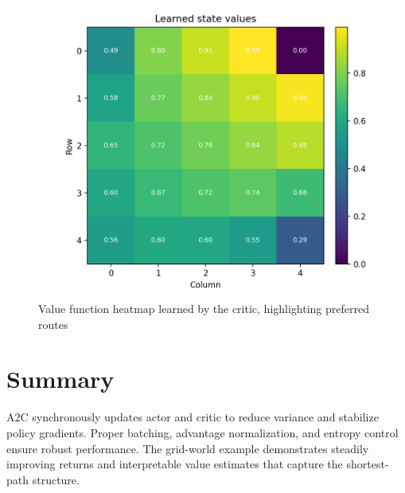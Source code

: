 ﻿\documentclass[12pt]{article}
\begin{document}
\begin{figure}[H]
  \centering
  \includegraphics[width=0.82\linewidth]{a2c_value_baseline.png}
  \caption{Value function heatmap learned by the critic, highlighting preferred routes}
  \label{fig:a2c_value_baseline}
\end{figure}

\FloatBarrier
\section{Summary}
A2C synchronously updates actor and critic to reduce variance and stabilize policy gradients. Proper batching, advantage normalization, and entropy control ensure robust performance. The grid-world example demonstrates steadily improving returns and interpretable value estimates that capture the shortest-path structure.
\end{document}
